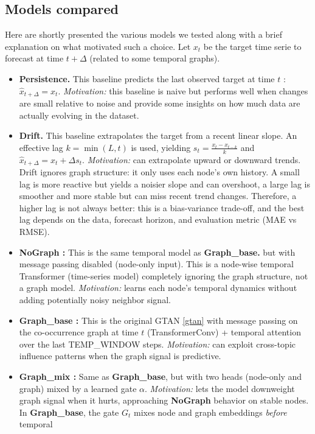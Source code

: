 \documentclass{article}
\begin{document}
\subsection{Models compared}
\label{modelvariants}
Here are shortly presented the various models we tested along with a brief explanation on what motivated such a choice. Let $x_t$ be the target time serie to forecast at time $t+\Delta$ (related to some temporal graphs).
\begin{itemize}
  \item \textbf{Persistence.} This baseline predicts the last observed target at time $t$ : $\hat{x}_{t+\Delta}=x_t$. \emph{Motivation:} this baseline is naive but performs well when changes are small relative to noise and provide some insights on how much data are actually evolving in the dataset.
  \item \textbf{Drift.} This baseline extrapolates the target from a recent linear slope. An effective lag
  $k=\min(L,t)$ is used, yielding
  $s_t = \frac{x_t - x_{t-k}}{k}$ and
  $\hat{x}_{t+\Delta} = x_t + \Delta s_t$.
  \emph{Motivation:} can extrapolate upward or downward trends. Drift ignores graph structure: it only uses each node's own history. A small lag is more reactive but yields a noisier slope and can overshoot,
  a large lag is smoother and more stable but can miss recent trend changes.
  Therefore, a higher lag is not always better: this is a bias-variance trade-off, and the best lag
  depends on the data, forecast horizon, and evaluation metric (MAE vs RMSE).
  \item \textbf{NoGraph :} This is the same temporal model as \textbf{Graph\_base.} but with message passing disabled (node-only
  input). This is a node-wise temporal Transformer (time-series model) completely ignoring the graph structure, not a graph model.
  \emph{Motivation:} learns each node’s temporal dynamics without adding potentially noisy
  neighbor signal.
  \item \textbf{Graph\_base :} This is the original GTAN \ref{gtan} with message passing on the co-occurrence graph at time $t$
  (TransformerConv) + temporal attention over the last TEMP\_WINDOW steps. \emph{Motivation:} can exploit cross-topic influence patterns when the graph signal is predictive.
  \item \textbf{Graph\_mix :} Same as \textbf{Graph\_base}, but with two heads (node-only and graph) mixed by a
  learned gate $\alpha$. \emph{Motivation:} lets the model downweight graph signal when it hurts,
  approaching \textbf{NoGraph} behavior on stable nodes. In \textbf{Graph\_base}, the gate $G_t$ mixes node and graph embeddings \emph{before} temporal

\end{itemize}
\end{document}

